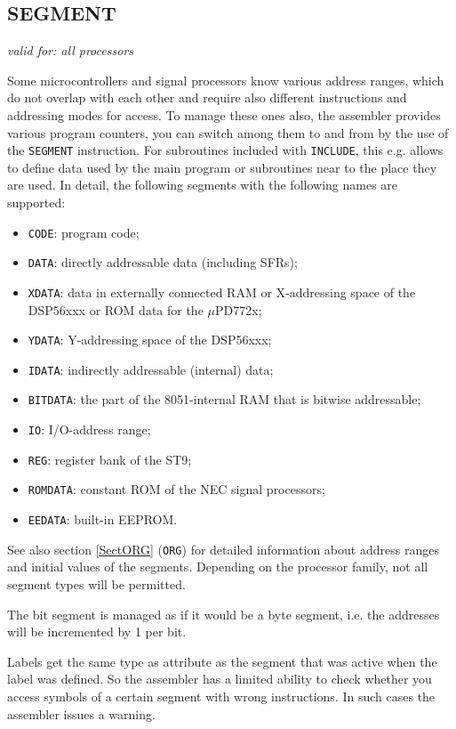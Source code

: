 \documentclass[12pt,twoside]{report}
\makeatletter
\newcommand{\tty}[1]{{\tt #1}}
\newcommand{\ttindex}[1]{\index{#1@{\tt #1}}}
\makeatother
\begin{document}

\subsection{SEGMENT}
\ttindex{SEGMENT}
\label{SEGMENT}

{\em valid for: all processors}

Some microcontrollers and signal processors know various address ranges,
which do not overlap with each other and require also different
instructions and addressing modes for access.  To manage these ones also,
the assembler provides various program counters, you can switch among
them to and from by the use of the \tty{SEGMENT} instruction.  For subroutines
included with \tty{INCLUDE}, this e.g. allows to define data used by the
main program or subroutines near to the place they are used.  In detail,
the following segments with the following names are supported:
\begin{itemize}
\item{\tty{CODE}: program code;}
\item{\tty{DATA}: directly addressable data (including SFRs);}
\item{\tty{XDATA}: data in externally connected RAM or
      X-addressing space of the DSP56xxx or ROM data for the $\mu$PD772x;}
\item{\tty{YDATA}: Y-addressing space of the DSP56xxx;}
\item{\tty{IDATA}: indirectly addressable (internal) data; }
\item{\tty{BITDATA}: the part of the 8051-internal RAM that is bitwise
      addressable;}
\item{\tty{IO}: I/O-address range;}
\item{\tty{REG}: register bank of the ST9;}
\item{\tty{ROMDATA}: constant ROM of the NEC signal processors;}
\item{\tty{EEDATA}: built-in EEPROM.}
\end{itemize}
See also section \ref{SectORG} (\tty{ORG}) for detailed information about
address ranges and initial values of the segments. Depending on the
processor family, not all segment types will be permitted.

The bit segment is managed as if it would be a byte segment, i.e. the
addresses will be incremented by 1 per bit.

Labels get the same type as attribute as the segment that was active
when the label was defined.  So the assembler has a limited ability
to check whether you access symbols of a certain segment with wrong
instructions.  In such cases the assembler issues a warning.
\end{document}
